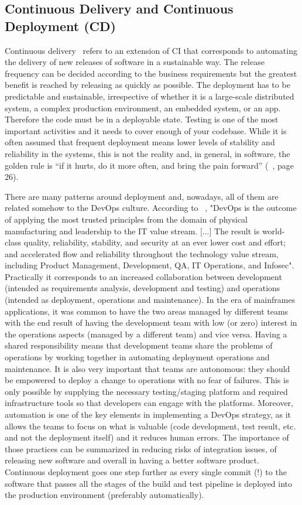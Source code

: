 \documentclass[a4paper]{spie}  %
\begin{document}
\subsection{Continuous Delivery and Continuous Deployment (CD)}
Continuous delivery~\cite{CD} refers to an extension of CI that corresponds to automating the delivery of new releases of software in a sustainable way. The release frequency can be decided according to the business requirements but the greatest benefit is reached by releasing as quickly as possible.
The deployment has to be predictable and sustainable, irrespective of whether it is a large-scale distributed system, a complex production environment, an embedded system, or an app. Therefore the code must be in a deployable state. Testing is one of the most important activities and it needs to cover enough of your codebase.
While it is often assumed that frequent deployment means lower levels of stability and reliability in the systems, this is not the reality and, in general, in software, the golden rule is “if it hurts, do it more often, and bring the pain forward” (~\cite{CD}, page 26).

There are many patterns around deployment and, nowadays, all of them are related somehow to the DevOps culture. According to ~\cite{DevOps}, "DevOps is the outcome of applying the most trusted principles from the domain of physical manufacturing and leadership to the IT value stream. [...] The result is world-class quality, reliability, stability, and security at an ever lower cost and effort; and accelerated flow and reliability throughout the technology value stream, including Product Management, Development, QA, IT Operations, and Infosec". Practically it corresponds to an increased collaboration between development (intended as requirements analysis, development and testing) and operations (intended as deployment, operations and maintenance). In the era of mainframes applications, it was common to have the two areas managed by different teams with the end result of having the development team with low (or zero) interest in the operations aspects (managed by a different team) and vice versa. Having a shared responsibility means that development teams share the problems of operations by working together in automating deployment operations and maintenance. It is also very important that teams are autonomous: they should be empowered to deploy a change to operations with no fear of failures. This is only possible by supplying the necessary testing/staging platform and required infrastructure tools so that developers can engage with the platforms.
Moreover, automation is one of the key elements in implementing a DevOps strategy, as it allows the teams to focus on what is valuable (code development, test result, etc. and not the deployment itself) and it reduces human errors.
The importance of those practices can be summarized in reducing risks of integration issues, of releasing new software and overall in having a better software product.
Continuous deployment goes one step further as every single commit (!) to the software that passes all the stages of the build and test pipeline is deployed into the production environment (preferably automatically).
\end{document}
